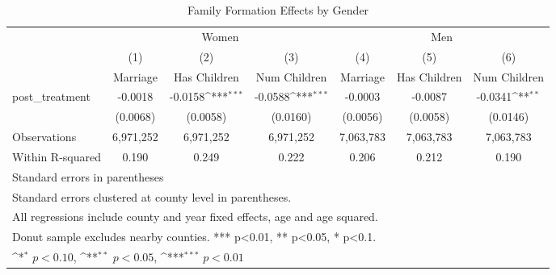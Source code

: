 \begin{table}[htbp]\centering
\def\sym#1{\ifmmode^{#1}\else\(^{#1}\)\fi}
\caption{Family Formation Effects by Gender}
\begin{tabular}{l*{6}{c}}
\hline\hline
            &\multicolumn{3}{c}{Women}                                        &\multicolumn{3}{c}{Men}                                          \\\cmidrule(lr){2-4}\cmidrule(lr){5-7}
            &\multicolumn{1}{c}{(1)}&\multicolumn{1}{c}{(2)}&\multicolumn{1}{c}{(3)}&\multicolumn{1}{c}{(4)}&\multicolumn{1}{c}{(5)}&\multicolumn{1}{c}{(6)}\\
            &\multicolumn{1}{c}{Marriage}&\multicolumn{1}{c}{Has Children}&\multicolumn{1}{c}{Num Children}&\multicolumn{1}{c}{Marriage}&\multicolumn{1}{c}{Has Children}&\multicolumn{1}{c}{Num Children}\\
\hline
post\_treatment&     -0.0018         &     -0.0158\sym{***}&     -0.0588\sym{***}&     -0.0003         &     -0.0087         &     -0.0341\sym{**} \\
            &    (0.0068)         &    (0.0058)         &    (0.0160)         &    (0.0056)         &    (0.0058)         &    (0.0146)         \\
\hline
Observations&   6,971,252         &   6,971,252         &   6,971,252         &   7,063,783         &   7,063,783         &   7,063,783         \\
Within R-squared&       0.190         &       0.249         &       0.222         &       0.206         &       0.212         &       0.190         \\
\hline\hline
\multicolumn{7}{l}{\footnotesize Standard errors in parentheses}\\
\multicolumn{7}{l}{\footnotesize Standard errors clustered at county level in parentheses.}\\
\multicolumn{7}{l}{\footnotesize All regressions include county and year fixed effects, age and age squared.}\\
\multicolumn{7}{l}{\footnotesize Donut sample excludes nearby counties. *** p<0.01, ** p<0.05, * p<0.1.}\\
\multicolumn{7}{l}{\footnotesize \sym{*} \(p<0.10\), \sym{**} \(p<0.05\), \sym{***} \(p<0.01\)}\\
\end{tabular}
\end{table}

